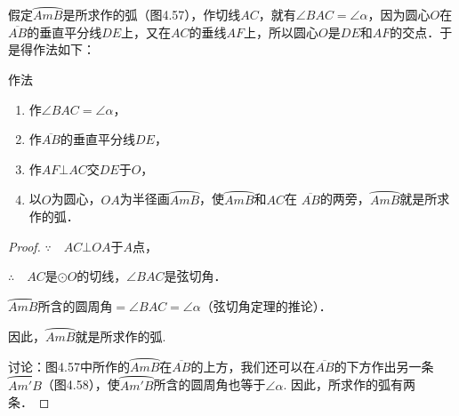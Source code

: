   \begin{analyze}
  假定$\wideparen{AmB}$是所求作的弧（图4.57），作切线${AC}$，就有$\angle BAC=\angle \alpha$，因为圆心$O$在$\overline{AB}$的垂直平分线$DE$上，又在$AC$的垂线$AF$上，所以圆心$O$是$DE$和$AF$的交点．于是得作法如下：
  \end{analyze}

  作法
  \begin{enumerate}
    \item 作$\angle BAC=\angle \alpha$，
    \item 作$\overline{AB}$的垂直平分线$DE$，
    \item 作$AF\bot AC$交$DE$于$O$，
    \item 以$O$为圆心，$OA$为半径画$\wideparen{AmB}$，使$\wideparen{AmB}$和$AC$在
    $\overline{AB}$的两旁，$\wideparen{AmB}$就是所求作的弧．
  \end{enumerate}

  
  \begin{proof}
  $\because\quad AC\bot OA$于$A$点，
  
  $\therefore\quad AC$是$\odot O$的切线，$\angle BAC$是弦切角．
  
  $\wideparen{AmB}$所含的圆周角$=\angle BAC=\angle \alpha$（弦切角定理的推论）．
  
  因此，$\wideparen{AmB}$就是所求作的弧.
  
  讨论：图4.57中所作的$\wideparen{AmB}$在$\overline{AB}$的上方，我们还可以在$\overline{AB}$的下方作出另一条$\wideparen{Am'B}$（图4.58），使$\wideparen{Am'B}$所含的圆周角也等于$\angle \alpha$. 因此，所求作的弧有两条．
  \end{proof}
  
